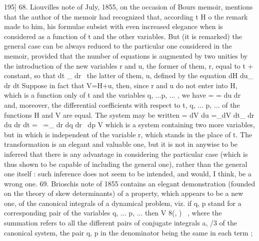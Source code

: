 \documentclass[12pt,a4paper]{article}
\theoremstyle{definition}
\begin{document}

195]
68. Liouvilles note of July, 1855, on the occasion of Bours memoir, mentions
that the author of the memoir had recognized that, according t H o the remark made to
him, his formulae subsist with even increased elegance when is considered as a
function of t and the other variables. But (it is remarked) the general case can be
always reduced to the particular one considered in the memoir, provided that the
number of equations is augmented by two unities by the introduction of the new
variables r and u, the former of them, r, equal to t + constant, so that
dt _
dr~
the latter of them, u, defined by the equation
dH
du_
dr dt
Suppose in fact that
V=H+u,
then, since r and u do not enter into H, which is a function only of t and the
variables q, ...p, ... , we have
= =
du dr
and, moreover, the differential coefficients with respect to t, q, ... p, ... of the functions
H and V are equal. The system may be written
= dV du =_dV
dt_
dr du dr dt
=~ =_
dr dq dr~ dp
V
which is a system containing two more variables, but in which is independent of
the variable r, which stands in the place of t. The transformation is an elegant and
valuable one, but it is not in anywise to be inferred that there is any advantage in
considering the particular case (which is thus shown to be capable of including the
general one), rather than the general one itself : such inference does not seem to be
intended, and would, I think, be a wrong one.
69. Brioschis note of 1855 contains an elegant demonstration (founded on the
theory of skew determinants) of a property, which appears to be a new one, of the
canonical integrals of a dynamical problem, viz. if q, p stand for a corresponding pair
of the variables q, ... p, ... then
V 8(, )~ ,
where the summation refers to all the different pairs of conjugate integrals a, /3 of
the canonical system, the pair q, p in the denominator being the same in each term ;


\end{document}
